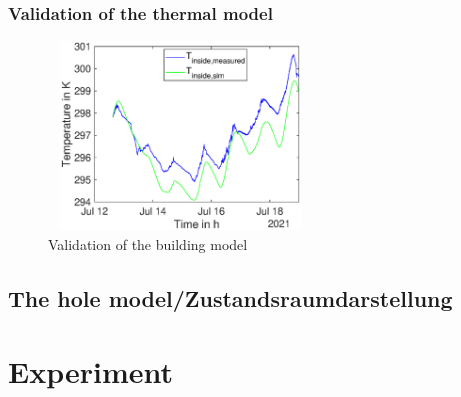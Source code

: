     \subsubsection{Validation of the thermal model}
    \label{validationthermalmodel}

     \begin{figure}
            \centering
            \includegraphics[width=7cm,height=5cm]{figure/Verlauf_inside_ValidierungModell.eps}
           \caption{Validation of the building model}
           \label{fig:ValidationModel}
       \end{figure}
        
    \subsection{The hole model/Zustandsraumdarstellung}
    \label{holeModel}
    
\section{Experiment}
\label{thermalmodel}





